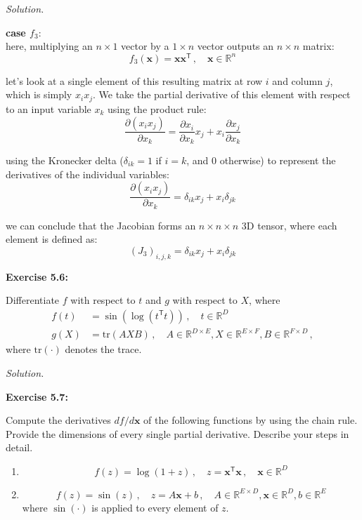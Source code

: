 \documentclass[12pt, a4paper]{article}
\newcommand{\R}{\mathbb{R}}        %
\newcommand{\bx}{\bm{x}}           %
\newcommand{\T}{\mathsf{T}}                      %
\newenvironment{problem}[1][Problem]{\noindent\textbf{#1:}\par\vspace{0.5em}}{\vspace{1em}}
\newenvironment{solution}{\noindent\textit{Solution.}\par\vspace{0.5em}}{\vspace{2em}}
\begin{document}
\begin{solution}
  \textbf{case $f_3$}: \\

  here, multiplying an $n \times 1$ vector by a $1 \times n$ vector outputs an $n \times n$ matrix: \\
  \[ f_3(\bx) = \bx\bx^\T \,, \quad \bx \in \R^n \]

  let's look at a single element of this resulting matrix at row $i$ and column $j$, which is simply $x_i x_j$. We take the partial derivative of this element with respect to an input variable $x_k$ using the product rule: \\
  \[ \frac{\partial (x_i x_j)}{\partial x_k} = \frac{\partial x_i}{\partial x_k}x_j + x_i\frac{\partial x_j}{\partial x_k} \]

  using the Kronecker delta ($\delta_{ik} = 1$ if $i=k$, and $0$ otherwise) to represent the derivatives of the individual variables: \\
  \[ \frac{\partial (x_i x_j)}{\partial x_k} = \delta_{ik}x_j + x_i\delta_{jk} \]

  we can conclude that the Jacobian forms an $n \times n \times n$ 3D tensor, where each element is defined as: \\
  \[ (J_3)_{i,j,k} = \delta_{ik}x_j + x_i\delta_{jk} \]

\end{solution}
\newpage

\begin{problem}[Exercise 5.6]
  Differentiate $f$ with respect to $t$ and $g$ with respect to $X$, where
  \begin{align*}
    f(t) &= \sin(\log(t^\T t)) \,, \quad t \in \R^D \\
    g(X) &= \text{tr}(AXB) \,, \quad A \in \R^{D \times E}, X \in \R^{E \times F}, B \in \R^{F \times D} \,,
  \end{align*}
  where $\text{tr}(\cdot)$ denotes the trace.
\end{problem}

\begin{solution}

\end{solution}
\newpage

\begin{problem}[Exercise 5.7]
  Compute the derivatives $df/d\bx$ of the following functions by using the chain rule. Provide the dimensions of every single partial derivative. Describe your steps in detail.
  \begin{enumerate}[label=\alph*.]
    \item 
    \[
      f(z) = \log(1+z) \,, \quad z = \bx^\T \bx \,, \quad \bx \in \R^D
    \]
    \item 
    \[
      f(z) = \sin(z) \,, \quad z = A\bx + b \,, \quad A \in \R^{E \times D}, \bx \in \R^D, b \in \R^E
    \]
    where $\sin(\cdot)$ is applied to every element of $z$.
  \end{enumerate}
\end{problem}
\end{document}
